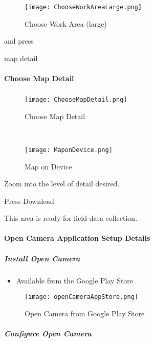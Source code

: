 \documentclass[class=book , crop=false, titlepage, twoside, multi={itemize, figure, verbatim}, float=false]{standalone}
\begin{document}
\vspace{.2in}

\clearpage


\begin{wrapfigure}{r}{0.5\textwidth}
\centering
\texttt{[image: ChooseWorkAreaLarge.png]}
\caption{Choose Work Area (large)}
\end{wrapfigure}

\vspace{.2in}

and press
\vspace{.2in}

map detail

\vspace{.2in}

\clearpage
%
%
%
\paragraph[Choose Map Detail]{Choose Map Detail\texorpdfstring{\\}{}}

\subparagraph*{}
%
%
\begin{wrapfigure}{r}{0.5\textwidth}
\centering
\texttt{[image: ChooseMapDetail.png]}
\caption{Choose Map Detail}
\vspace{.25in}

\HRule \\[.4cm] %
\vspace{.25in}

\texttt{[image: MaponDevice.png]}
\caption{Map on Device}
\end{wrapfigure}
Zoom into the level of detail desired.
\vspace{.5in}

\noindent Press Download
\vspace{3.5in}

\noindent This area is ready for field data collection.
\clearpage
%
%
%
\paragraph{Open Camera Application Setup Details}

\subparagraph{Install Open Camera}
\begin{itemize}
\item Available from the Google Play Store
\end{itemize}
%
%
\begin{figure}[h!]
\centering
    \texttt{[image: openCameraAppStore.png]}
\caption{Open Camera from Google Play Store}
\end{figure}
\clearpage
%
%
%
\subparagraph{Configure Open Camera}
\end{document}
